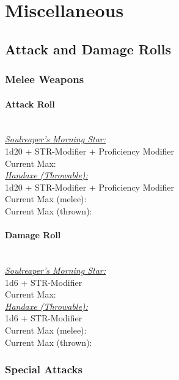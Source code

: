 \documentclass[letterpaper,openany,oneside,twocolumn]{book}
\begin{document}
\section*{Miscellaneous}
\subsection*{Attack and Damage Rolls}
\subsubsection*{Melee Weapons}
\paragraph*{Attack Roll}\hfill\\
\underline{\textit{Soulreaper's Morning Star:}}\\
1d20 + STR-Modifier + Proficiency Modifier\\
\indent Current Max: 
\\
\underline{\textit{Handaxe (Throwable):}}\\
1d20 + STR-Modifier + Proficiency Modifier\\
\indent Current Max (melee): \\
\indent Current Max (thrown): 
\paragraph*{Damage Roll}\hfill\\
\underline{\textit{Soulreaper's Morning Star:}}\\
1d6 + STR-Modifier\\
\indent Current Max: 
\\
\underline{\textit{Handaxe (Throwable):}}\\
1d6 + STR-Modifier\\
\indent Current Max (melee): \\
\indent Current Max (thrown): 
\subsubsection*{Special Attacks}
\end{document}
